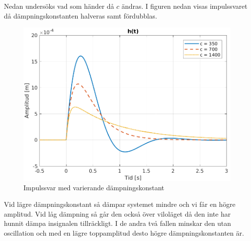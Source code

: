 \newpage
Nedan undersöks vad som händer då $c$ ändras. I figuren nedan visas impulssvaret då dämpningskonstanten halveras samt fördubblas.
\begin{figure}[H]
    \centering
    \includegraphics[scale=0.9]{bilder/impulssvar_variation_c}
    \caption{Impulssvar med varierande dämpningskonstant}
    \label{fig:impulssvar_variation_c}
\end{figure}
Vid lägre dämpningskonstant så dämpar systemet mindre och vi får en högre amplitud. Vid låg dämpning så går den också över viloläget då den inte har hunnit dämpa insignalen tillräckligt. I de andra två fallen minskar den utan oscillation och med en lägre toppamplitud desto högre dämpningskonstanten är.

\newpage
